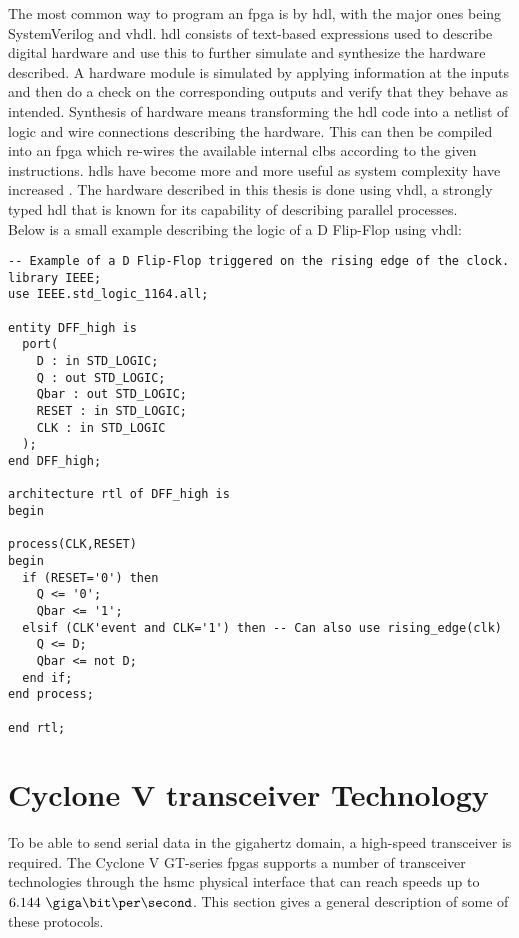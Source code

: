 \documentclass[main.tex]{subfiles}
\begin{document}
The most common way to program an \gls{fpga} is by \gls{hdl}, with the major ones being SystemVerilog and \acrshort{vhdl}. \Gls{hdl} consists of text-based expressions used to describe digital hardware and use this to further simulate and synthesize the hardware described. A hardware module is simulated by applying information at the inputs and then do a check on the corresponding outputs and verify that they behave as intended. Synthesis of hardware means transforming the \gls{hdl} code into a netlist of logic and wire connections describing the hardware. This can then be compiled into an \gls{fpga} which re-wires the available internal \glspl{clb} according to the given instructions. \glspl{hdl} have become more and more useful as system complexity have increased \cite{weste11}. The hardware described in this thesis is done using \acrshort{vhdl}, a strongly typed \gls{hdl} that is known for its capability of describing parallel processes.\\ 

Below is a small example describing the logic of a D Flip-Flop using \acrshort{vhdl}:


\begin{lstlisting}[frame=single] 
-- Example of a D Flip-Flop triggered on the rising edge of the clock.
library IEEE; 
use IEEE.std_logic_1164.all; 
 
entity DFF_high is 
  port( 
    D : in STD_LOGIC; 
    Q : out STD_LOGIC; 
    Qbar : out STD_LOGIC; 
    RESET : in STD_LOGIC; 
    CLK : in STD_LOGIC 
  ); 
end DFF_high; 
 
architecture rtl of DFF_high is 
begin 
 
process(CLK,RESET) 
begin 
  if (RESET='0') then 
    Q <= '0'; 
    Qbar <= '1'; 
  elsif (CLK'event and CLK='1') then -- Can also use rising_edge(clk)
    Q <= D; 
    Qbar <= not D; 
  end if; 
end process;
  
end rtl; 
\end{lstlisting}


\section{Cyclone V transceiver Technology}

To be able to send serial data in the gigahertz domain, a high-speed transceiver is required. The Cyclone V GT-series \glspl{fpga} supports a number of transceiver technologies through the \gls{hsmc} physical interface that can reach speeds up to $6.144\ \giga\bit\per\second$. This section gives a general description of some of these protocols.
\end{document}
